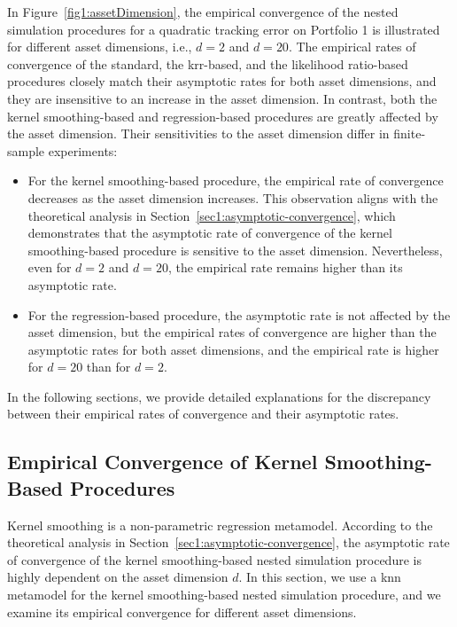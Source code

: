 In Figure~\ref{fig1:assetDimension}, the empirical convergence of the nested simulation procedures for a quadratic tracking error on Portfolio 1 is illustrated for different asset dimensions, i.e., $d = 2$ and $d = 20$.
The empirical rates of convergence of the standard, the \gls{krr}-based, and the likelihood ratio-based procedures closely match their asymptotic rates for both asset dimensions, and they are insensitive to an increase in the asset dimension.
In contrast, both the kernel smoothing-based and regression-based procedures are greatly affected by the asset dimension.
Their sensitivities to the asset dimension differ in finite-sample experiments:
\begin{itemize}    
    \item For the kernel smoothing-based procedure, the empirical rate of convergence decreases as the asset dimension increases. 
    This observation aligns with the theoretical analysis in Section~\ref{sec1:asymptotic-convergence}, which demonstrates that the asymptotic rate of convergence of the kernel smoothing-based procedure is sensitive to the asset dimension.
    Nevertheless, even for $d = 2$ and $d = 20$, the empirical rate remains higher than its asymptotic rate.
    \item For the regression-based procedure, the asymptotic rate is not affected by the asset dimension, but the empirical rates of convergence are higher than the asymptotic rates for both asset dimensions, and the empirical rate is higher for $d = 20$ than for $d = 2$.
\end{itemize}
In the following sections, we provide detailed explanations for the discrepancy between their empirical rates of convergence and their asymptotic rates.

\subsection{Empirical Convergence of Kernel Smoothing-Based Procedures}\label{sec1:kernel-smoothing-convergence}

Kernel smoothing is a non-parametric regression metamodel.
According to the theoretical analysis in Section~\ref{sec1:asymptotic-convergence}, the asymptotic rate of convergence of the kernel smoothing-based nested simulation procedure is highly dependent on the asset dimension $d$.
In this section, we use a \gls{knn} metamodel for the kernel smoothing-based nested simulation procedure, and we examine its empirical convergence for different asset dimensions.


